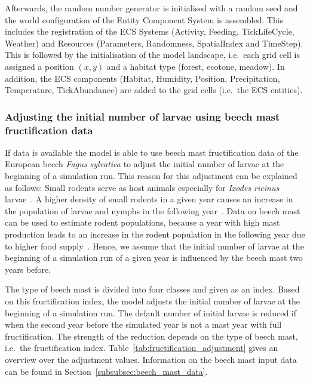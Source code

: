 \documentclass[a4paper, 11pt]{scrartcl}
\begin{document}
Afterwards, the random number generator is initialised with a random seed and the world configuration of the Entity Component System is assembled. This includes the
registration of the ECS Systems (Activity, Feeding, TickLifeCycle, Weather) and Resources (Parameters, Randomness, SpatialIndex and TimeStep). This is followed by the
initialisation of the model landscape, i.e.\ each grid cell is assigned a position $(x, y)$ and a habitat type (forest, ecotone, meadow). In addition, the ECS components
(Habitat, Humidity, Position, Precipitation, Temperature, TickAbundance) are added to the grid cells (i.e.\ the ECS entities).



\subsubsection{Adjusting the initial number of larvae using beech mast fructification data}\label{subsubsec:initial_larvae_with_beech_mast}
If data is available the model is able to use beech mast fructification data of the European beech \textit{Fagus sylvatica} to adjust the initial number of larvae at the
beginning of a simulation run. This reason for this adjustment can be explained as follows: Small rodents serve as host animals especially for \textit{Ixodes ricinus}
larvae~\parencite{Cayol.2017}. A higher density of small rodents in a given year causes an increase in the population of larvae and nymphs in the following
year~\parencite{Brugger.2018}. Data on beech mast can be used to estimate rodent populations, because a year with high mast production leads to an increase in the rodent
population in the following year due to higher food supply~\parencite{Clement.2009}. Hence, we assume that the initial number of larvae at the beginning of a simulation run of
a given year is influenced by the beech mast two years before.

The type of beech mast is divided into four classes and given as an index. Based on this fructification index, the model adjusts the initial number of larvae at the beginning of
a simulation run. The default number of initial larvae is reduced if when the second year before the simulated year is not a mast year with full fructification. The strength of
the reduction depends on the type of beech mast, i.e.\ the fructification index. Table~\ref{tab:fructification_adjustment} gives an overview over the adjustment values.
Information on the beech mast input data can be found in Section~\ref{subsubsec:beech_mast_data}.
\end{document}
